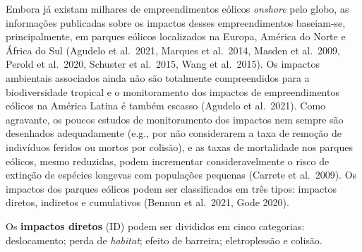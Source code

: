 \documentclass[
  oneside]{scrbook}
\begin{document}
Embora já existam milhares de empreendimentos eólicos \emph{onshore} pelo globo, as informações publicadas sobre os impactos desses empreendimentos baseiam-se, principalmente, em parques eólicos localizados na Europa, América do Norte e África do Sul (Agudelo et al.~2021, Marques et al.~2014, Masden et al.~2009, Perold et al.~2020, Schuster et al.~2015, Wang et al.~2015). Os impactos ambientais associados ainda não são totalmente compreendidos para a biodiversidade tropical e o monitoramento dos impactos de empreendimentos eólicos na América Latina é também escasso (Agudelo et al.~2021). Como agravante, os poucos estudos de monitoramento dos impactos nem sempre são desenhados adequadamente (e.g., por não considerarem a taxa de remoção de indivíduos feridos ou mortos por colisão), e as taxas de mortalidade nos parques eólicos, mesmo reduzidas, podem incrementar consideravelmente o risco de extinção de espécies longevas com populações pequenas (Carrete et al.~2009). Os impactos dos parques eólicos podem ser classificados em três tipos: impactos diretos, indiretos e cumulativos (Bennun et al.~2021, Gode 2020).

Os \textbf{impactos diretos} (ID) podem ser divididos em cinco categorias: deslocamento; perda de \emph{habitat}; efeito de barreira; eletroplessão e colisão.
\end{document}
